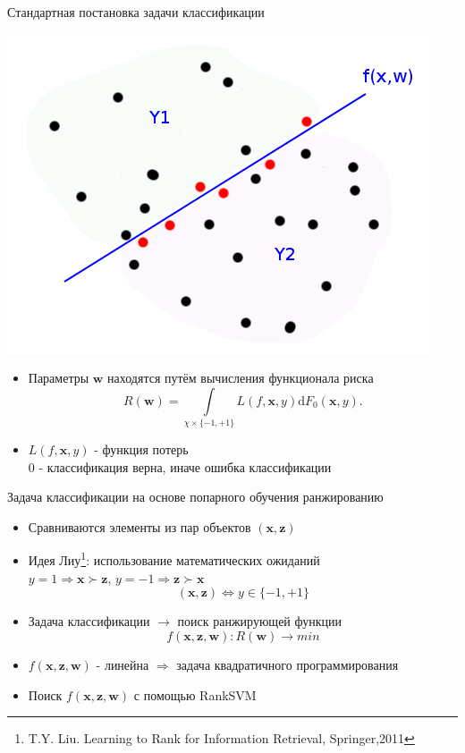 \documentclass[11pt]{beamer}
\begin{document}
\begin{frame}{Стандартная постановка задачи классификации}

\begin{center}
		\includegraphics[scale=0.3]{standard_classification_problem}
	\end{center}

\begin{itemize}
	\item Параметры \(\mathbf{w}\) находятся путём вычисления функционала риска
		\[R(\mathbf{w}) = \int \limits_{\chi \times \{-1, +1\}} L(f, \mathbf{x}, y) \mathrm{d} F_0(\mathbf{x}, y).\]
	\item \(L(f, \mathbf{x}, y)\) - функция потерь \\
		\(0\) - классификация верна, иначе ошибка классификации
\end{itemize}

\end{frame}
\begin{frame}{Задача классификации на основе попарного обучения ранжированию}

\begin{itemize}
	\item Сравниваются элементы из пар объектов \((\mathbf{x}, \mathbf{z})\)
	\item Идея Лиу\footnote{T.Y. Liu. Learning to Rank for Information Retrieval, Springer,2011}: использование математических ожиданий\\
	\(y = 1 \Rightarrow \mathbf{x} \succ \mathbf{z}\),
	\(y = -1 \Rightarrow \mathbf{z} \succ \mathbf{x}\)
	\[(\mathbf{x}, \mathbf{z}) \Leftrightarrow y \in \{-1, +1\}\]
	\item Задача классификации \(\rightarrow\) поиск ранжирующей функции
	\[f(\mathbf{x}, \mathbf{z}, \mathbf{w}): R(\mathbf{w}) \rightarrow min\]
	\item \(f(\mathbf{x}, \mathbf{z}, \mathbf{w})\) - линейна \(\Rightarrow\) задача квадратичного программирования
	\item Поиск \(f(\mathbf{x}, \mathbf{z}, \mathbf{w})\) с помощью RankSVM
\end{itemize}

\end{frame}
\end{document}
